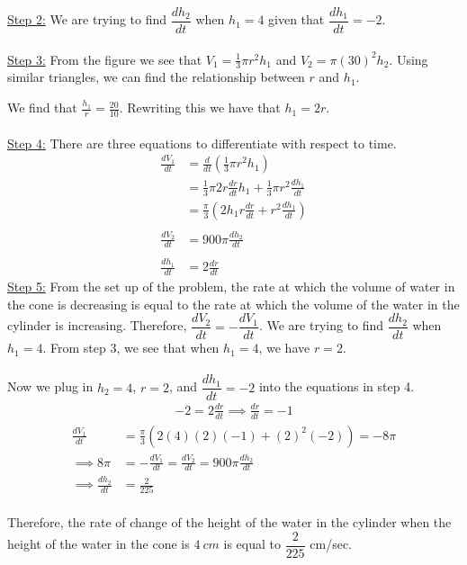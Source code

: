 \documentclass[reqno,psamsfonts]{amsart}
\theoremstyle{definition}
\theoremstyle{remark}
\numberwithin{equation}{section}
\begin{document}
\begin{enumerate}
\begin{center}
\end{center}
\underline{Step 2:} We are trying to find $\dfrac{dh_{2}}{dt}$ when $h_{1} = 4$ given that $\dfrac{dh_{1}}{dt}=-2$. 
\\
\\
\underline{Step 3:} From the figure we see that $V_{1} = \frac{1}{3}\pi r^2h_{1}$ and $V_{2} = \pi(30)^2h_{2}$. Using similar triangles, we can find the relationship between $r$ and $h_{1}$. 
\\
\begin{center}
\end{center}
We find that $\frac{h_{1}}{r}=\frac{20}{10}$. Rewriting this we have that $h_{1}=2r$. 
\\
\\
\underline{Step 4:} There are three equations to differentiate with respect to time.
\begin{align*}
\frac{dV_{1}}{dt}&=\frac{d}{dt}\left(\frac{1}{3}\pi r^2h_{1}\right)\\
&=\frac{1}{3}\pi2r\frac{dr}{dt}h_{1}+\frac{1}{3}\pi r^2\frac{dh_{1}}{dt}\\
&=\frac{\pi}{3}\left(2h_{1}r\frac{dr}{dt}+r^2\frac{dh_{1}}{dt}\right)\\
\\
\frac{dV_{2}}{dt}&=900\pi\frac{dh_{2}}{dt}
\\
\\
\frac{dh_{1}}{dt}&=2\frac{dr}{dt}
\end{align*}
\underline{Step 5:} From the set up of the problem, the rate at which the volume of water in the cone is decreasing is equal to the rate at which the volume of the water in the cylinder is increasing. Therefore, $\dfrac{dV_{2}}{dt}=-\dfrac{dV_{1}}{dt}$. We are trying to find $\dfrac{dh_{2}}{dt}$ when $h_{1}= 4$. From step 3, we see that when $h_{1} = 4$, we have $r=2$.  
\\
\\Now we plug in $h_{2} = 4$, $r=2$, and $\dfrac{dh_{1}}{dt}=-2$ into the equations in step 4. 
\begin{align*}
-2=2\frac{dr}{dt}\implies \frac{dr}{dt}=-1
\end{align*}
\begin{align*}
\frac{dV_{1}}{dt}&=\frac{\pi}{3}(2(4)(2)(-1)+(2)^2(-2))=-8\pi\\
\implies 8\pi &= -\frac{dV_{1}}{dt}=\frac{dV_{2}}{dt}=900\pi\frac{dh_{2}}{dt}\\
\implies \frac{dh_{2}}{dt}&=\frac{2}{225}
\end{align*}
\\
Therefore, the rate of change of the height of the water in the cylinder when the height of the water in the cone is $4\ cm$ is equal to $\dfrac{2}{225}$ cm/sec.
 \end{enumerate}
\end{document}
